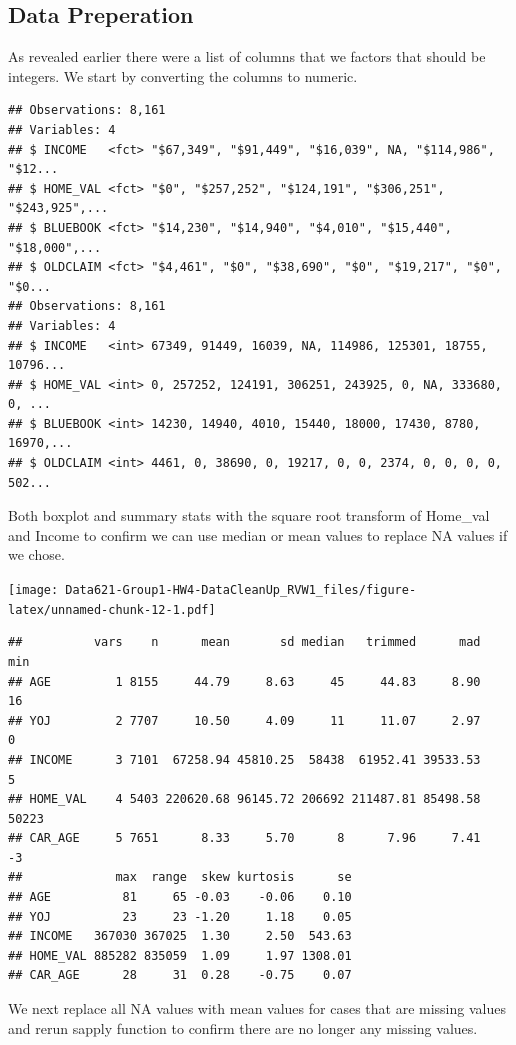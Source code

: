 \documentclass[]{article}
\begin{document}
\subsection{Data Preperation}\label{data-preperation}

As revealed earlier there were a list of columns that we factors that
should be integers. We start by converting the columns to numeric.

\begin{verbatim}
## Observations: 8,161
## Variables: 4
## $ INCOME   <fct> "$67,349", "$91,449", "$16,039", NA, "$114,986", "$12...
## $ HOME_VAL <fct> "$0", "$257,252", "$124,191", "$306,251", "$243,925",...
## $ BLUEBOOK <fct> "$14,230", "$14,940", "$4,010", "$15,440", "$18,000",...
## $ OLDCLAIM <fct> "$4,461", "$0", "$38,690", "$0", "$19,217", "$0", "$0...
## Observations: 8,161
## Variables: 4
## $ INCOME   <int> 67349, 91449, 16039, NA, 114986, 125301, 18755, 10796...
## $ HOME_VAL <int> 0, 257252, 124191, 306251, 243925, 0, NA, 333680, 0, ...
## $ BLUEBOOK <int> 14230, 14940, 4010, 15440, 18000, 17430, 8780, 16970,...
## $ OLDCLAIM <int> 4461, 0, 38690, 0, 19217, 0, 0, 2374, 0, 0, 0, 0, 502...
\end{verbatim}

Both boxplot and summary stats with the square root transform of
Home\_val and Income to confirm we can use median or mean values to
replace NA values if we chose.

\texttt{[image: Data621-Group1-HW4-DataCleanUp\_RVW1\_files/figure-latex/unnamed-chunk-12-1.pdf]}

\begin{verbatim}
##          vars    n      mean       sd median   trimmed      mad   min
## AGE         1 8155     44.79     8.63     45     44.83     8.90    16
## YOJ         2 7707     10.50     4.09     11     11.07     2.97     0
## INCOME      3 7101  67258.94 45810.25  58438  61952.41 39533.53     5
## HOME_VAL    4 5403 220620.68 96145.72 206692 211487.81 85498.58 50223
## CAR_AGE     5 7651      8.33     5.70      8      7.96     7.41    -3
##             max  range  skew kurtosis      se
## AGE          81     65 -0.03    -0.06    0.10
## YOJ          23     23 -1.20     1.18    0.05
## INCOME   367030 367025  1.30     2.50  543.63
## HOME_VAL 885282 835059  1.09     1.97 1308.01
## CAR_AGE      28     31  0.28    -0.75    0.07
\end{verbatim}

We next replace all NA values with mean values for cases that are
missing values and rerun sapply function to confirm there are no longer
any missing values.
\end{document}
